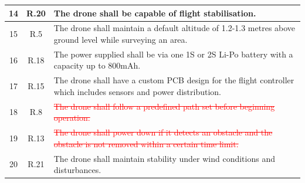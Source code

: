 \begin{table}[H]
\begin{tabular}{|c|c|p{11cm}|}
14 & R.20 & The drone shall be capable of flight stabilisation. \\ \hline
15 & R.5 & The drone shall maintain a default altitude of 1.2-1.3 metres above ground level while surveying an area. \\ \hline
16 & R.18 & The power supplied shall be via one 1S or 2S Li-Po battery with a capacity up to 800mAh. \\ \hline
17 & R.15 & The drone shall have a custom PCB design for the flight controller which includes sensors and power distribution. \\ \hline
18 & R.8 & \textcolor{red}{\sout{The drone shall follow a predefined path set before beginning operation.}} \\ \hline
19 & R.13 & \textcolor{red}{\sout{The drone shall power down if it detects an obstacle and the obstacle is not removed within a certain time limit.}} \\ \hline
20 & R.21 & The drone shall maintain stability under wind conditions and disturbances. \\ \hline
\end{tabular}
\end{table}

